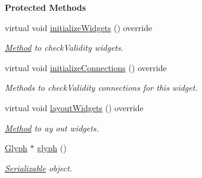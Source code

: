 \begin{Indent}\textbf{ Protected Methods}\par
\begin{DoxyCompactItemize}
\item 
\mbox{\label{classrev_1_1_view_1_1_glyph_widget_a81f66865535688308162731714e21d50}} 
virtual void \mbox{\hyperlink{classrev_1_1_view_1_1_glyph_widget_a81f66865535688308162731714e21d50}{initialize\+Widgets}} () override
\begin{DoxyCompactList}\small\item\em \mbox{\hyperlink{struct_method}{Method}} to check\+Validity widgets. \end{DoxyCompactList}\item 
\mbox{\label{classrev_1_1_view_1_1_glyph_widget_a80078ddee4814bd23eb3c6f68f95556a}} 
virtual void \mbox{\hyperlink{classrev_1_1_view_1_1_glyph_widget_a80078ddee4814bd23eb3c6f68f95556a}{initialize\+Connections}} () override
\begin{DoxyCompactList}\small\item\em Methods to check\+Validity connections for this widget. \end{DoxyCompactList}\item 
\mbox{\label{classrev_1_1_view_1_1_glyph_widget_ace018977ac8faae22d21a955fdb55517}} 
virtual void \mbox{\hyperlink{classrev_1_1_view_1_1_glyph_widget_ace018977ac8faae22d21a955fdb55517}{layout\+Widgets}} () override
\begin{DoxyCompactList}\small\item\em \mbox{\hyperlink{struct_method}{Method}} to ay out widgets. \end{DoxyCompactList}\item 
\mbox{\label{classrev_1_1_view_1_1_glyph_widget_a43f81f8b0cc76b58cd84103d920021ba}} 
\mbox{\hyperlink{classrev_1_1_glyph}{Glyph}} $\ast$ \mbox{\hyperlink{classrev_1_1_view_1_1_glyph_widget_a43f81f8b0cc76b58cd84103d920021ba}{glyph}} ()
\begin{DoxyCompactList}\small\item\em \mbox{\hyperlink{classrev_1_1_serializable}{Serializable}} object. \end{DoxyCompactList}\item 

\end{DoxyCompactItemize}
\end{Indent}
